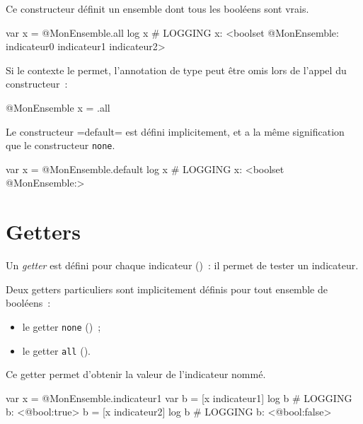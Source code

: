 Ce constructeur définit un ensemble dont tous les booléens sont vrais.

\begin{galgas}
var x = @MonEnsemble.all
log x # LOGGING x: <boolset @MonEnsemble: indicateur0 indicateur1 indicateur2>
\end{galgas}

Si le contexte le permet, l'annotation de type peut être omis lors de l'appel du constructeur~:
\begin{galgas}
@MonEnsemble x = .all
\end{galgas}



Le constructeur \ggs=default= est défini implicitement, et a la même signification que le constructeur \texttt{none}.

\begin{galgas}
var x = @MonEnsemble.default
log x # LOGGING x: <boolset @MonEnsemble:>
\end{galgas}














\section{Getters}

Un \emph{getter} est défini pour chaque indicateur ()~: il permet de tester un indicateur.

Deux getters particuliers sont implicitement définis pour tout ensemble de booléens~:
\begin{itemize}
  \item le getter \texttt{none} ()~;
  \item le getter \texttt{all} ().
\end{itemize}


Ce getter permet d'obtenir la valeur de l'indicateur nommé.

\begin{galgas}
var x = @MonEnsemble.indicateur1
var b = [x indicateur1]
log b # LOGGING b: <@bool:true>
b = [x indicateur2]
log b # LOGGING b: <@bool:false>
\end{galgas}



